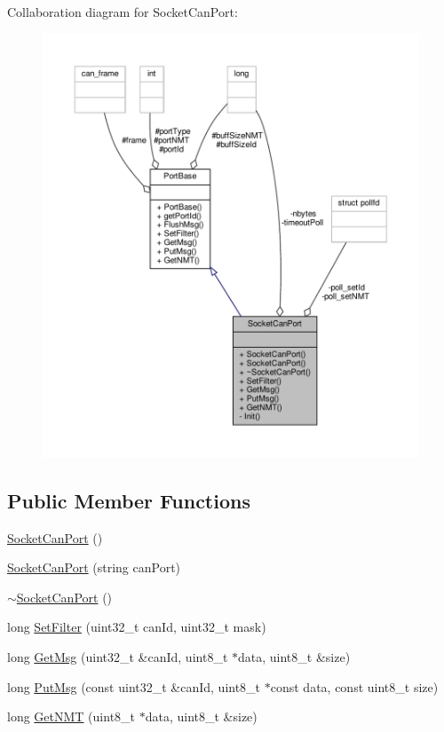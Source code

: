 Collaboration diagram for Socket\+Can\+Port\+:\nopagebreak
\begin{figure}[H]
\begin{center}
\leavevmode
\includegraphics[width=350pt]{classSocketCanPort__coll__graph}
\end{center}
\end{figure}
\subsection*{Public Member Functions}
\begin{DoxyCompactItemize}
\item 
\hyperlink{classSocketCanPort_af3593609acea236b10646732e277837f}{Socket\+Can\+Port} ()
\item 
\hyperlink{classSocketCanPort_a087bc07f3c1658e3cb994d85fcb3da5e}{Socket\+Can\+Port} (string can\+Port)
\item 
\hyperlink{classSocketCanPort_a0d004347e49110daa1ee29e1d1bc85c0}{$\sim$\+Socket\+Can\+Port} ()
\item 
long \hyperlink{classSocketCanPort_a1a5d0866524dae11ddff0d1ac22e0dd5}{Set\+Filter} (uint32\+\_\+t can\+Id, uint32\+\_\+t mask)
\item 
long \hyperlink{classSocketCanPort_aa9684efc602da057cb4928d52395af33}{Get\+Msg} (uint32\+\_\+t \&can\+Id, uint8\+\_\+t $\ast$data, uint8\+\_\+t \&size)
\item 
long \hyperlink{classSocketCanPort_a9375a0c1e33978c83ebd188100898633}{Put\+Msg} (const uint32\+\_\+t \&can\+Id, uint8\+\_\+t $\ast$const data, const uint8\+\_\+t size)
\item 
long \hyperlink{classSocketCanPort_a2efe27bd3bb8c8127c89925e1e21535a}{Get\+N\+MT} (uint8\+\_\+t $\ast$data, uint8\+\_\+t \&size)
\end{DoxyCompactItemize}
